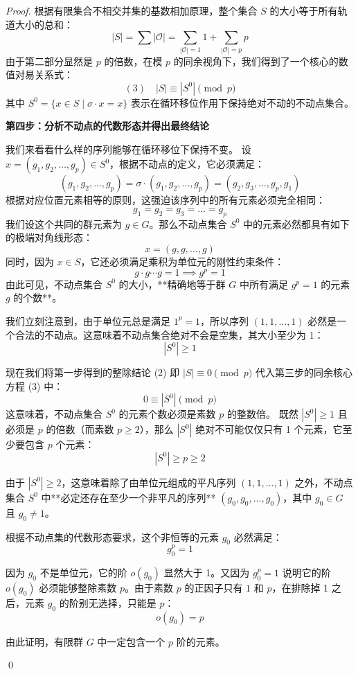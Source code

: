 \documentclass[]{article}
\begin{document}
\begin{proof}
根据有限集合不相交并集的基数相加原理，整个集合 $S$ 的大小等于所有轨道大小的总和：
\[ |S| = \sum |\mathcal{O}| = \sum_{|\mathcal{O}|=1} 1 + \sum_{|\mathcal{O}|=p} p \]
由于第二部分显然是 $p$ 的倍数，在模 $p$ 的同余视角下，我们得到了一个核心的数值对易关系式：
\[ (3) \quad |S| \equiv |S^0| \pmod p \]
其中 $S^0 = \{ x \in S \mid \sigma \cdot x = x \}$ 表示在循环移位作用下保持绝对不动的不动点集合。

\bigskip
\noindent \textbf{第四步：分析不动点的代数形态并得出最终结论}

我们来看看什么样的序列能够在循环移位下保持不变。
设 $x = (g_1, g_2, \dots, g_p) \in S^0$，根据不动点的定义，它必须满足：
\[ (g_1, g_2, \dots, g_p) = \sigma \cdot (g_1, g_2, \dots, g_p) = (g_2, g_3, \dots, g_p, g_1) \]
根据对应位置元素相等的原则，这强迫该序列中的所有元素必须完全相同：
\[ g_1 = g_2 = g_3 = \dots = g_p \]
我们设这个共同的群元素为 $g \in G$。那么不动点集合 $S^0$ 中的元素必然都具有如下的极端对角线形态：
\[ x = (g, g, \dots, g) \]
同时，因为 $x \in S$，它还必须满足乘积为单位元的刚性约束条件：
\[ g \cdot g \cdots g = 1 \implies g^p = 1 \]
由此可见，不动点集合 $S^0$ 的大小，**精确地等于群 $G$ 中所有满足 $g^p = 1$ 的元素 $g$ 的个数**。

我们立刻注意到，由于单位元总是满足 $1^p = 1$，所以序列 $(1, 1, \dots, 1)$ 必然是一个合法的不动点。这意味着不动点集合绝对不会是空集，其大小至少为 1：
\[ |S^0| \geqslant 1 \]

现在我们将第一步得到的整除结论 (2) 即 $|S| \equiv 0 \pmod p$ 代入第三步的同余核心方程 (3) 中：
\[ 0 \equiv |S^0| \pmod p \]
这意味着，不动点集合 $S^0$ 的元素个数必须是素数 $p$ 的整数倍。
既然 $|S^0| \geqslant 1$ 且必须是 $p$ 的倍数（而素数 $p \ge 2$），那么 $|S^0|$ 绝对不可能仅仅只有 1 个元素，它至少要包含 $p$ 个元素：
\[ |S^0| \geqslant p \geqslant 2 \]

由于 $|S^0| \ge 2$，这意味着除了由单位元组成的平凡序列 $(1, 1, \dots, 1)$ 之外，不动点集合 $S^0$ 中**必定还存在至少一个非平凡的序列** $(g_0, g_0, \dots, g_0)$，其中 $g_0 \in G$ 且 $g_0 \neq 1$。

根据不动点集的代数形态要求，这个非恒等的元素 $g_0$ 必然满足：
\[ g_0^p = 1 \]

因为 $g_0$ 不是单位元，它的阶 $o(g_0)$ 显然大于 1。又因为 $g_0^p = 1$ 说明它的阶 $o(g_0)$ 必须能够整除素数 $p$。由于素数 $p$ 的正因子只有 $1$ 和 $p$，在排除掉 1 之后，元素 $g_0$ 的阶别无选择，只能是 $p$：
\[ o(g_0) = p \]

由此证明，有限群 $G$ 中一定包含一个 $p$ 阶的元素。

\qed


\end{proof}
\end{document}
